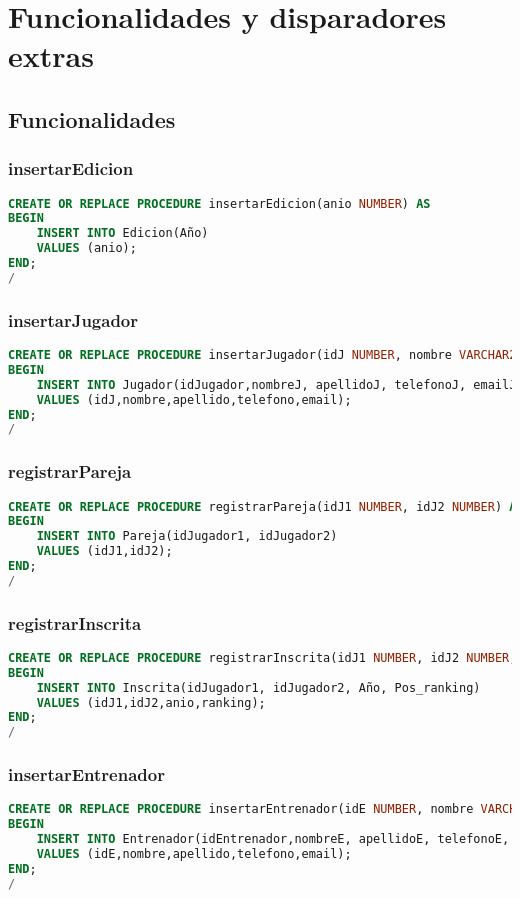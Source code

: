 \chapter{Funcionalidades y disparadores extras}\label{cap:extras}
\section{Funcionalidades}
\subsection{insertarEdicion}
\begin{lstlisting}[language=sql]
CREATE OR REPLACE PROCEDURE insertarEdicion(anio NUMBER) AS
BEGIN
    INSERT INTO Edicion(Año)
    VALUES (anio);
END;
/
\end{lstlisting}

\subsection{insertarJugador}
\begin{lstlisting}[language=sql]
CREATE OR REPLACE PROCEDURE insertarJugador(idJ NUMBER, nombre VARCHAR2, apellido VARCHAR2, telefono VARCHAR2, email VARCHAR2) AS
BEGIN
    INSERT INTO Jugador(idJugador,nombreJ, apellidoJ, telefonoJ, emailJ)
    VALUES (idJ,nombre,apellido,telefono,email);
END;
/
\end{lstlisting}

\subsection{registrarPareja}
\begin{lstlisting}[language=sql]
CREATE OR REPLACE PROCEDURE registrarPareja(idJ1 NUMBER, idJ2 NUMBER) AS
BEGIN
    INSERT INTO Pareja(idJugador1, idJugador2)
    VALUES (idJ1,idJ2);
END;
/
\end{lstlisting}

\subsection{registrarInscrita}
\begin{lstlisting}[language=sql]
CREATE OR REPLACE PROCEDURE registrarInscrita(idJ1 NUMBER, idJ2 NUMBER, anio NUMBER, ranking NUMBER) AS
BEGIN
    INSERT INTO Inscrita(idJugador1, idJugador2, Año, Pos_ranking)
    VALUES (idJ1,idJ2,anio,ranking);
END;
/
\end{lstlisting}
\pagebreak
\subsection{insertarEntrenador}
\begin{lstlisting}[language=sql]
CREATE OR REPLACE PROCEDURE insertarEntrenador(idE NUMBER, nombre VARCHAR2, apellido VARCHAR2, telefono VARCHAR2, email VARCHAR2) AS
BEGIN
    INSERT INTO Entrenador(idEntrenador,nombreE, apellidoE, telefonoE, emailE)
    VALUES (idE,nombre,apellido,telefono,email);
END;
/
\end{lstlisting}

